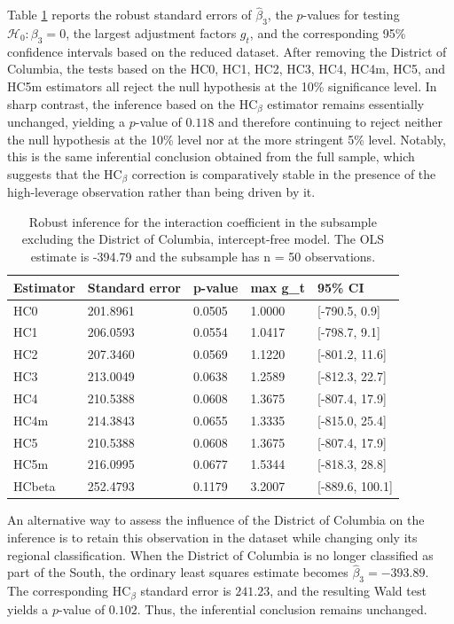 Table \ref{tab:comparison-nodc} reports the robust standard errors of \(\hat{\beta}_3\), the \(p\)-values for testing \(\mathcal{H}_0\colon \beta_3 = 0\), the largest adjustment factors \(g_t\), and the corresponding 95\% confidence intervals based on the reduced dataset. After removing the District of Columbia, the tests based on the HC0, HC1, HC2, HC3, HC4, HC4m, HC5, and HC5m estimators all reject the null hypothesis at the 10\% significance level. In sharp contrast, the inference based on the \(\text{HC}_\beta\) estimator remains essentially unchanged, yielding a \(p\)-value of \(0.118\) and therefore continuing to reject neither the null hypothesis at the 10\% level nor at the more stringent 5\% level. Notably, this is the same inferential conclusion obtained from the full sample, which suggests that the \(\text{HC}_\beta\) correction is comparatively stable in the presence of the high-leverage observation rather than being driven by it.

\begin{table}

\caption{\label{tab:comparison-nodc}Robust inference for the interaction coefficient in the subsample excluding the District of Columbia, intercept-free model. The OLS estimate is -394.79 and the subsample has n = 50 observations.}
\centering
\begin{tabular}[t]{lllll}
\toprule
Estimator & Standard error & p-value & max g\_t & 95\% CI\\
\midrule
HC0 & 201.8961 & 0.0505 & 1.0000 & {}[-790.5, 0.9]\\
HC1 & 206.0593 & 0.0554 & 1.0417 & {}[-798.7, 9.1]\\
HC2 & 207.3460 & 0.0569 & 1.1220 & {}[-801.2, 11.6]\\
HC3 & 213.0049 & 0.0638 & 1.2589 & {}[-812.3, 22.7]\\
HC4 & 210.5388 & 0.0608 & 1.3675 & {}[-807.4, 17.9]\\
\addlinespace
HC4m & 214.3843 & 0.0655 & 1.3335 & {}[-815.0, 25.4]\\
HC5 & 210.5388 & 0.0608 & 1.3675 & {}[-807.4, 17.9]\\
HC5m & 216.0995 & 0.0677 & 1.5344 & {}[-818.3, 28.8]\\
HCbeta & 252.4793 & 0.1179 & 3.2007 & {}[-889.6, 100.1]\\
\bottomrule
\end{tabular}
\end{table}

An alternative way to assess the influence of the District of Columbia on the inference is to retain this observation in the dataset while changing only its regional classification. When the District of Columbia is no longer classified as part of the South, the ordinary least squares estimate becomes \(\hat{\beta}_3 = -393.89\). The corresponding \(\text{HC}_\beta\) standard error is \(241.23\), and the resulting Wald test yields a \(p\)-value of \(0.102\). Thus, the inferential conclusion remains unchanged.

